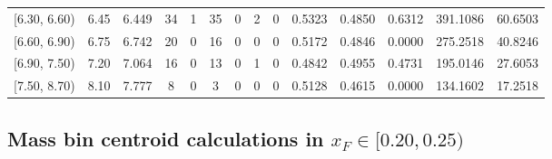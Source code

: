 \begin{table}[htbp]
{\begin{tabular}{cc|c|cccccc|ccc|cc}
        {[6.30, 6.60)} & 6.45 & 6.449 & 34 & 1 & 35 & 0 & 2 & 0 & 0.5323 & 0.4850 & 0.6312 & 391.1086 & 60.6503 \\
        {[6.60, 6.90)} & 6.75 & 6.742 & 20 & 0 & 16 & 0 & 0 & 0 & 0.5172 & 0.4846 & 0.0000 & 275.2518 & 40.8246 \\
        {[6.90, 7.50)} & 7.20 & 7.064 & 16 & 0 & 13 & 0 & 1 & 0 & 0.4842 & 0.4955 & 0.4731 & 195.0146 & 27.6053 \\
        {[7.50, 8.70)} & 8.10 & 7.777 & 8 & 0 & 3 & 0 & 0 & 0 & 0.5128 & 0.4615 & 0.0000 & 134.1602 & 17.2518 \\
        \hline\hline
    \end{tabular}
    }
\end{table}

\clearpage
\subsection{\texorpdfstring{Mass bin centroid calculations in $x_F \in [0.20, 0.25)$}{Mass bin centroid calculations in x\_F in [0.20, 0.25)]}}

